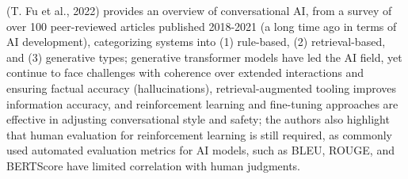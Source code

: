 \documentclass[
  12pt,
  letterpaper,
  DIV=11,
  numbers=noendperiod]{scrartcl}
\begin{document}
(T. Fu et al., 2022) provides an overview of conversational AI, from a
survey of over 100 peer-reviewed articles published 2018-2021 (a long
time ago in terms of AI development), categorizing systems into (1)
rule-based, (2) retrieval-based, and (3) generative types; generative
transformer models have led the AI field, yet continue to face
challenges with coherence over extended interactions and ensuring
factual accuracy (hallucinations), retrieval-augmented tooling improves
information accuracy, and reinforcement learning and fine-tuning
approaches are effective in adjusting conversational style and safety;
the authors also highlight that human evaluation for reinforcement
learning is still required, as commonly used automated evaluation
metrics for AI models, such as BLEU, ROUGE, and BERTScore have limited
correlation with human judgments.

\def\pandoctableshortcapt{Areas of Focus in Conversational AI
Development}
\end{document}
